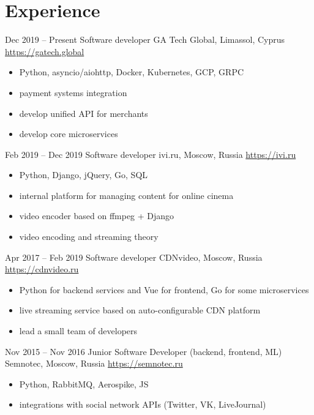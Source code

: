 \documentclass[11pt,a4paper]{moderncv}
\begin{document}
\maketitle

\section{Experience}
  \cventry
    {Dec 2019 – Present}
    {Software developer}
    {GA Tech Global, Limassol, Cyprus}
    {\url{https://gatech.global}}
    {}
    {
      \begin{itemize}\setlength\itemindent{6pt}
        \item Python, asyncio/aiohttp, Docker, Kubernetes, GCP, GRPC
        \item payment systems integration
        \item develop unified API for merchants
        \item develop core microservices
      \end{itemize}
    }
  \cventry
    {Feb 2019 – Dec 2019}
    {Software developer}
    {ivi.ru, Moscow, Russia}
    {\url{https://ivi.ru}}
    {}
    {
      \begin{itemize}\setlength\itemindent{6pt}
        \item Python, Django, jQuery, Go, SQL
        \item internal platform for managing content for online cinema
        \item video encoder based on ffmpeg + Django
        \item video encoding and streaming theory
      \end{itemize}
    }

  \cventry
    {Apr 2017 – Feb 2019}
    {Software developer}
    {CDNvideo, Moscow, Russia}
    {\url{https://cdnvideo.ru}}
    {}
    {
      \begin{itemize}\setlength\itemindent{6pt}
        \item Python for backend services and Vue for frontend, Go for some microservices
        \item live streaming service based on auto-configurable CDN platform
        \item lead a small team of developers
      \end{itemize}
    }

  \cventry
    {Nov 2015 – Nov 2016}
    {Junior Software Developer (backend, frontend, ML)}
    {Semnotec, Moscow, Russia}
    {\url{https://semnotec.ru}}
    {}
    {
      \begin{itemize}\setlength\itemindent{6pt}
        \item Python, RabbitMQ, Aerospike, JS
        \item integrations with social network APIs (Twitter, VK, LiveJournal)
      \end{itemize}
    }
\end{document}
